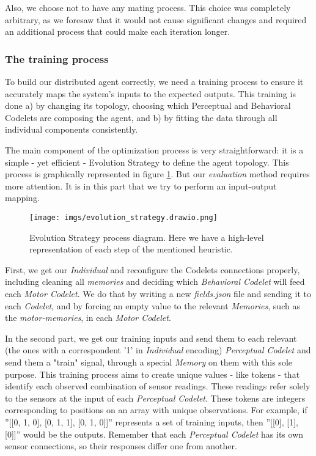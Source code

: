 

Also, we choose not to have any mating process. This choice was completely arbitrary, as we foresaw that it would not cause significant changes and required an additional process that could make each iteration longer.


\subsubsection{The training process}

To build our distributed agent correctly, we need a training process to ensure it accurately maps the system's inputs to the expected outputs. This training is done a) by changing its topology, choosing which Perceptual and Behavioral Codelets are composing the agent, and b) by fitting the data through all individual components consistently. 

The main component of the optimization process is very straightforward: it is a simple - yet efficient - Evolution Strategy to define the agent topology. This process is graphically represented in figure \ref{fig:evol_strategy}. But our \emph{evaluation} method requires more attention. It is in this part that we try to perform an input-output mapping.


\begin{figure}[ht]
\centering
	\texttt{[image: imgs/evolution\_strategy.drawio.png]}
\caption{Evolution Strategy process diagram. Here we have a high-level representation of each step of the mentioned heuristic.}
\label{fig:evol_strategy}
\end{figure}


First, we get our \emph{Individual} and reconfigure the Codelets connections properly, including cleaning all \emph{memories} and deciding which \emph{Behavioral Codelet} will feed each \emph{Motor Codelet}. We do that by writing a new \emph{fields.json} file and sending it to each \emph{Codelet}, and by forcing an empty value to the relevant \emph{Memories}, such as the \emph{motor-memories}, in each \emph{Motor Codelet}.

In the second part, we get our training inputs and send them to each relevant (the ones with a correspondent '1' in \emph{Individual} encoding) \emph{Perceptual Codelet} and send them a "train" signal, through a special \emph{Memory} on them with this sole purpose. This training process aims to create unique values - like tokens - that identify each observed combination of sensor readings. These readings refer solely to the sensors at the input of each \emph{Perceptual Codelet}. These tokens are integers corresponding to positions on an array with unique observations. For example, if ''[[0, 1, 0], [0, 1, 1], [0, 1, 0]]'' represents a set of training inputs, then ''[[0], [1], [0]]'' would be the outputs. Remember that each \emph{Perceptual Codelet} has its own sensor connections, so their responses differ one from another.


